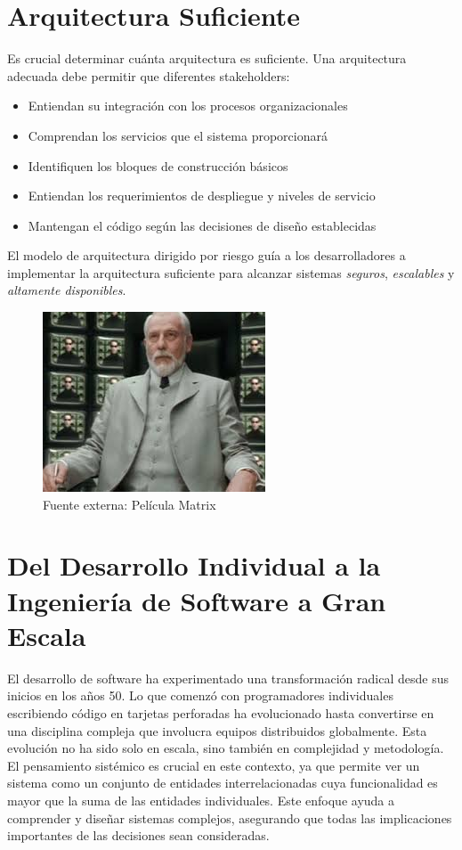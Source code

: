 \section{Arquitectura Suficiente}

Es crucial determinar cuánta arquitectura es suficiente. Una arquitectura adecuada debe permitir que diferentes stakeholders:
\begin{itemize}
    \item Entiendan su integración con los procesos organizacionales
    \item Comprendan los servicios que el sistema proporcionará
    \item Identifiquen los bloques de construcción básicos
    \item Entiendan los requerimientos de despliegue y niveles de servicio
    \item Mantengan el código según las decisiones de diseño establecidas
\end{itemize}

El modelo de arquitectura dirigido por riesgo guía a los desarrolladores a implementar la arquitectura suficiente para alcanzar sistemas \textit{seguros}, \textit{escalables} y \textit{altamente disponibles}.

\begin{figure}
    \centering
    \includegraphics{Pictures/elarquitecto.png}
    \caption{Fuente externa: Película Matrix}
    \label{fig:arq}
\end{figure}

\section{Del Desarrollo Individual a la Ingeniería de Software a Gran Escala}

El desarrollo de software ha experimentado una transformación radical desde sus inicios en los años 50. Lo que comenzó con programadores individuales escribiendo código en tarjetas perforadas ha evolucionado hasta convertirse en una disciplina compleja que involucra equipos distribuidos globalmente. Esta evolución no ha sido solo en escala, sino también en complejidad y metodología. El pensamiento sistémico es crucial en este contexto, ya que permite ver un sistema como un conjunto de entidades interrelacionadas cuya funcionalidad es mayor que la suma de las entidades individuales. Este enfoque ayuda a comprender y diseñar sistemas complejos, asegurando que todas las implicaciones importantes de las decisiones sean consideradas.

